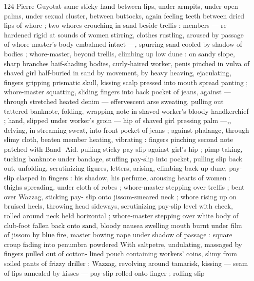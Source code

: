 124 Pierre Guyotat
same sticky hand between lips, under armpits, under open palms,
under sexual cluster, between buttocks, again feeling teeth between
dried lips of whore ; two whores crouching in sand beside trellis :
members — re-hardened rigid at sounds of women stirring, clothes
rustling, aroused by passage of whore-master's body embalmed
intact —, spurring sand cooled by shadow of bodies ; whore-master,
beyond trellis, climbing up low dune : on sandy slope, sharp
branches haif-shading bodies, curly-haired worker, penis pinched in
vulva of shaved girl half-buried in sand by movement, by heavy
heaving, ejaculating, fingers gripping prismatic skull, kissing scalp
pressed into mouth spread panting ; whore-master squatting, sliding
fingers into back pocket of jeans, against — through stretched
heated denim — effervescent arse sweating, pulling out tattered
banknote, folding, wrapping note in shaved worker's bloody
handkerchief ; hand, slipped under worker's groin — hip of shaved
girl pressing palm —,, delving, in streaming sweat, into front pocket
of jeans ; against phalange, through slimy cloth, beaten member
heating, vibrating : fingers pinching second note patched with Band-
Aid. pulling sticky pay-slip against girl's hip ; pimp taking, tucking
banknote under bandage, stuffing pay-slip into pocket, pulling slip
back out, unfolding, scrutinizing figures, letters, arising, climbing
back up dune, pay-slip clasped in fingers : his shadow, his perfume,
arousing hearts of women : thighs spreading, under cloth of robes ;
whore-master stepping over trellis ; bent over Wazzag, sticking pay-
slip onto jissom-smeared neck ; whore rising up on bruised heels,
throwing head sideways, scrutinizing pay-slip level with cheek, rolled
around neck held horizontal ; whore-master stepping over white body
of club-foot fallen back onto sand, bloody nausea swelling mouth
burnt under film of jissom by blue fire, master bowing nape under
shadow of passage : square croup fading into penumbra powdered
With saltpetre, undulating, massaged by fingers pulled out of cotton-
lined pouch containing workers’ coins, slimy from soiled pants of
frizzy driller ; Wazzag, revolving around tamarisk, kissing — seam of
lips annealed by kisses — pay-slip rolled onto finger ; rolling slip

